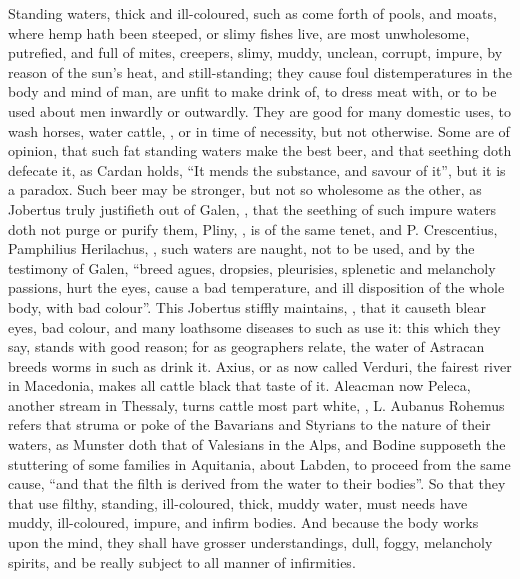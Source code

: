 Standing waters, thick and ill-coloured, such as come forth of pools, and
moats, where hemp hath been steeped, or slimy fishes live, are most
unwholesome, putrefied, and full of mites, creepers, slimy, muddy, unclean,
corrupt, impure, by reason of the sun's heat, and still-standing; they cause
foul distemperatures in the body and mind of man, are unfit to make drink of,
to dress meat with, or to be used about men inwardly or
outwardly. They are good for many domestic uses, to wash horses, water cattle,
\etc{}, or in time of necessity, but not otherwise. Some are of opinion, that
such fat standing waters make the best beer, and that seething doth defecate
it, as Cardan holds,  \enquote{It mends the substance, and savour of it}, but it is a paradox. Such
beer may be stronger, but not so wholesome as the other, as
Jobertus truly justifieth out of Galen,
, that the seething of such
impure waters doth not purge or purify them, Pliny, , is of the same tenet, and P. Crescentius,
 Pamphilius
Herilachus, , such waters are
naught, not to be used, and by the testimony of Galen,
\enquote{breed agues, dropsies, pleurisies, splenetic and melancholy passions, hurt the
eyes, cause a bad temperature, and ill disposition of the whole body, with bad
colour}. This Jobertus stiffly maintains, , that it causeth blear eyes, bad colour, and many loathsome diseases
to such as use it: this which they say, stands with good reason; for as
geographers relate, the water of Astracan breeds worms in such as drink it.
Axius, or as now called Verduri, the fairest river in
Macedonia, makes all cattle black that taste of it. Aleacman now Peleca,
another stream in Thessaly, turns cattle most part white, ,
L. Aubanus Rohemus refers that struma or poke of the
Bavarians and Styrians to the nature of their waters, as
Munster doth that of Valesians in the Alps, and
Bodine supposeth the stuttering of some families in
Aquitania, about Labden, to proceed from the same cause, \enquote{and that the filth is
derived from the water to their bodies}. So that they that use filthy,
standing, ill-coloured, thick, muddy water, must needs have muddy,
ill-coloured, impure, and infirm bodies. And because the body works upon the
mind, they shall have grosser understandings, dull, foggy, melancholy spirits,
and be really subject to all manner of infirmities.

